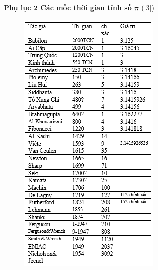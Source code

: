 \begin{multicols}{2}
	\vskip 0.1cm
	\textbf{\color{lichsutoanhoc}Phụ lục $\pmb2$ Các mốc thời gian tính số $\pmb{\pi}$ }([$3$])
	\begin{figure}[H]
		\vspace*{-5pt}
		\centering
		\captionsetup{labelformat= empty, justification=centering}
		\includegraphics[width= 1\linewidth]{4}

\end{figure}
\end{multicols}

